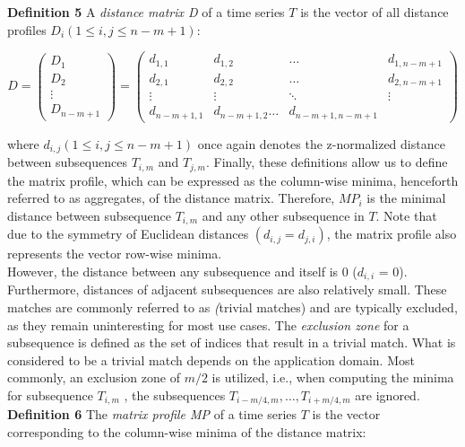 \textbf{Definition 5} A \textit{distance matrix D} of a time series $T$ is the vector of all distance profiles \( D_i \left(1 \le i, j \le n - m + 1\right) \):

\[
    D =
    \begin{pmatrix}
        D_1    \\
        D_2    \\
        \vdots \\
        D_{n-m+1}
    \end{pmatrix}
    =
    \begin{pmatrix}
        d_{1,1}     & d_{1,2}           & \dots           & d_{1,n-m+1} \\
        d_{2,1}     & d_{2,2}           & \dots           & d_{2,n-m+1} \\
        \vdots      & \vdots            & \ddots          & \vdots      \\
        d_{n-m+1,1} & d_{n-m+1,2} \dots & d_{n-m+1,n-m+1}
    \end{pmatrix}
\]

where \(d_{i,j} \left(1 \le i, j \le n - m + 1\right) \) once again denotes the z-normalized distance between subsequences $T_{i,m}$ and $T_{j,m}$. Finally, these definitions allow us to define the matrix profile, which can be expressed
as the column-wise minima, henceforth referred to as aggregates, of the distance matrix. Therefore, $MP_{i}$ is the minimal distance between subsequence $T_{i,m}$ and any other subsequence in $T$. Note that due to the symmetry of Euclidean distances \((d_{i,j} = d_{j,i} )\),
the matrix profile also represents the vector row-wise minima.\\

However, the distance between any subsequence and itself is 0 ($d_{i,i}$ = 0). Furthermore, distances of adjacent subsequences are also relatively small. These matches are
commonly referred to as \textit(trivial matches) and are typically excluded, as they remain uninteresting for most use cases. The \textit{exclusion zone} for a subsequence is defined as the set of indices that result in a trivial match. What is considered to be a trivial
match depends on the application domain. Most commonly, an exclusion zone of $m/2$ is utilized, i.e., when computing the minima for subsequence $T_{i,m}$ , the subsequences \( T_{i-m/4,m} ,\dots, T_{i+m/4,m} \) are ignored.\\

\textbf{Definition 6} The \textit{matrix profile MP} of a time series $T$ is the vector corresponding to the column-wise minima of the distance matrix:

